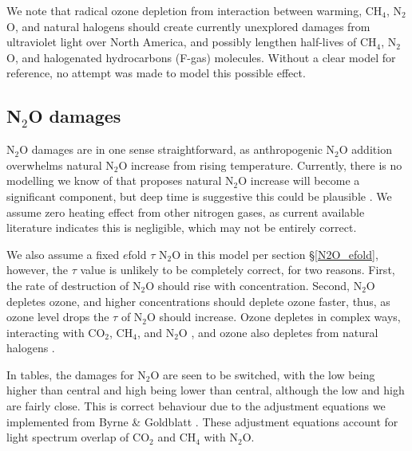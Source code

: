 \documentclass{article}
\begin{document}
We note that radical ozone depletion from interaction between warming, CH$_4$, N$_2$O, \cite{Portman2012StratoOzonDepletion} and natural halogens \cite{Anderson2017ChlorineBromineCatalysis,Anderson2018CouplingCatalysis} should create currently unexplored damages from ultraviolet light over North America, and possibly lengthen half-lives of CH$_4$, N$_2$O, and halogenated hydrocarbons (F-gas) molecules. Without a clear model for reference, no attempt was made to model this possible effect. 

\subsection{N$_2$O damages}
\label{N2O_damages}
N$_2$O damages are in one sense straightforward, as anthropogenic N$_2$O addition overwhelms natural N$_2$O increase from rising temperature. Currently, there is no modelling we know of that proposes natural N$_2$O increase will become a significant component, but deep time is suggestive this could be plausible \cite{ROBERSON2011_N2OandCH4Proterozoic,Junium2018EoceneN2O}.  We assume zero heating effect from other nitrogen gases, as current available literature indicates this is negligible, which may not be entirely correct. 

We also assume a fixed $e$fold $\tau$ N$_2$O in this model per section \S\ref{N2O_efold}, however, the $\tau$ value is unlikely to be completely correct, for two reasons. First, the rate of destruction of N$_2$O should rise with concentration. Second, N$_2$O depletes ozone, and higher concentrations should deplete ozone faster, thus, as ozone level drops the $\tau$ of N$_2$O should increase. Ozone depletes in complex ways, interacting with CO$_2$, CH$_4$, and N$_2$O  \cite{Portman2012StratoOzonDepletion, Prather2023ObservedDecreasingN2Olifetime}, and ozone also depletes from natural halogens \cite{Anderson2017ChlorineBromineCatalysis,Anderson2018CouplingCatalysis}.

In tables, the damages for N$_2$O are seen to be switched, with the low being higher than central and high being lower than central, although the low and high are fairly close. This is correct behaviour due to the adjustment equations we implemented from Byrne \& Goldblatt \cite[p. 157, Table 2]{Byrne2014RadiativeForcingEquations}. These adjustment equations account for light spectrum overlap of CO$_2$ and CH$_4$ with N$_2$O.
\end{document}
